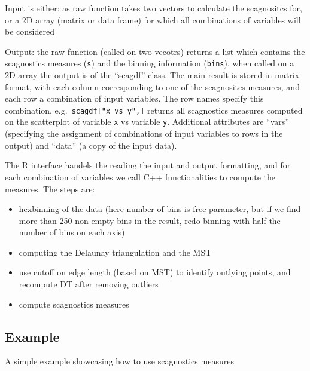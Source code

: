 Input is either: as raw function takes two vectors to calculate the
scagnositcs for, or a 2D array (matrix or data frame) for which all
combinations of variables will be considered

Output: the raw function (called on two vecotrs) returns a list which
contains the scagnostics measures (\texttt{s}) and the binning
information (\texttt{bins}), when called on a 2D array the output is of
the ``scagdf'' class. The main result is stored in matrix format, with
each column corresponding to one of the scagnositcs measures, and each
row a combination of input variables. The row names specify this
combination, e.g.~\texttt{scagdf{[}"x\ vs\ y",{]}} returns all
scagnostics measures computed on the scatterplot of variable \texttt{x}
vs variable \texttt{y}. Additional attributes are ``vars'' (specifying
the assignment of combinations of input variables to rows in the output)
and ``data'' (a copy of the input data).

The R interface handels the reading the input and output formatting, and
for each combination of variables we call C++ functionalities to compute
the measures. The steps are:

\begin{itemize}
\tightlist
\item
  hexbinning of the data (here number of bins is free parameter, but if
  we find more than 250 non-empty bins in the result, redo binning with
  half the number of bins on each axis)
\item
  computing the Delaunay triangulation and the MST
\item
  use cutoff on edge length (based on MST) to identify outlying points,
  and recompute DT after removing outliers
\item
  compute scagnostics measures
\end{itemize}

\hypertarget{example}{%
\subsection{Example}\label{example}}

A simple example showcasing how to use scagnostics measures

\begin{Schunk}
\end{Schunk}

